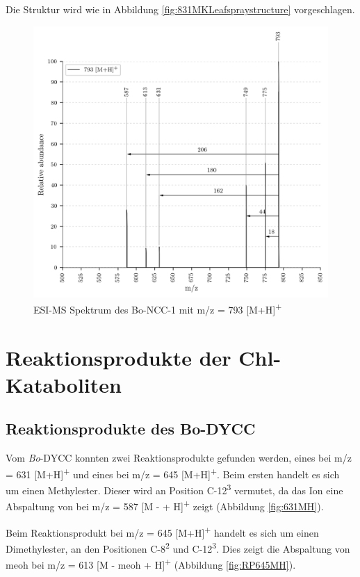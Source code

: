 Die Struktur wird wie in Abbildung \ref{fig:831MKLeafspraystructure} vorgeschlagen.

\begin{figure}[!htbp]
  \centering
  \includegraphics[width=\textwidth, height=0.7\textwidth]{figures/Kapitel7/Kataboliten/VWA_MS_793.png}
  \caption[ESI-MS Spektrum des Bo-NCC-1, Quelle: Autor]{ESI-MS Spektrum des Bo-NCC-1 mit m/z = 793 [M+H]\textsuperscript{+}}
  \label{fig:793MH}
\end{figure}



\pagebreak
\section{Reaktionsprodukte der Chl-Kataboliten}

\subsection{Reaktionsprodukte des Bo-DYCC}

Vom \textit{Bo}-DYCC konnten zwei Reaktionsprodukte gefunden werden, eines bei m/z = 631 [M+H]\textsuperscript{+} und eines bei m/z = 645 [M+H]\textsuperscript{+}. Beim ersten handelt es sich um einen Methylester. Dieser wird an Position C-12\textsuperscript{3} vermutet, da das Ion eine Abspaltung von  bei m/z = 587 [M -  + H]\textsuperscript{+} zeigt (Abbildung \ref{fig:631MH}). 

Beim Reaktionsprodukt bei m/z = 645 [M+H]\textsuperscript{+} handelt es sich um einen Dimethylester, an den Positionen C-8\textsuperscript{2} und C-12\textsuperscript{3}.  Dies zeigt die Abspaltung von \gls{meoh} bei m/z = 613 [M - \gls{meoh} + H]\textsuperscript{+} (Abbildung \ref{fig:RP645MH}). 

